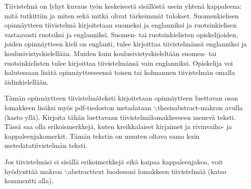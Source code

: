 \documentclass[finnish, 12pt, a4paper, arts, utf8, a-2b, online]{aaltothesis}
\date{30.6.2025}
\begin{document}
\makecoverpage{}

\makecopyrightpage{}


\begin{abstractpage}[finnish]
Tiivistelmä on lyhyt kuvaus työn keskeisestä sisällöstä usein yhtenä kappaleena:
mitä tutkittiin ja miten sekä mitkä olivat tärkeimmät tulokset. Suomenkielisen
opinnäytteen tiivistelmä kirjoitetaan suomeksi ja englanniksi ja ruotsinkielisen
vastaavasti ruotsiksi ja englanniksi. Suomen- tai ruotsinkielisten
opiskelijoiden, joiden opinnäytteen kieli on englanti, tulee kirjoittaa
tiivistelmänsä englanniksi ja koulusivistyskielellään. Muiden kuin
koulusivistyskieleltään suomen- tai ruotsinkielisten tulee kirjoittaa
tiivistelmänsä vain englanniksi. Opiskelija voi halutessaan lisätä
opinnäytteeseensä toisen tai kolmannen tiivistelmän omalla äidinkielellään.

Tämän opinnäytteen tiivistelmäteksti kirjoitetaan opinnäytteen luettavan osan 
lomakkeen lisäksi myös pdf-tiedoston metadataan 
$\backslash$thesisabstract-makron avulla (kasto yllä). Kirjoita tähän
luettavaan tiivistelmälomakkeeseen menevä teksti. Tässä saa olla erikoismerkkejä,
kuten kreikkalaiset kirjaimet ja rivinvaiho- ja kappaleenjakomerkit. Tämän
tekstin on muuten oltava sama kuin metedatatiivistelmän teksti.

Jos tiivistelmäsi ei sisällä erikoimerkkejä eikä kaipaa kappaleenjakoa, voit
hyödynttää makroa $\backslash$abstracttext luodessasi lomakkeen tiivistelmää
(katso kommentti alla).
\end{abstractpage}
\end{document}
